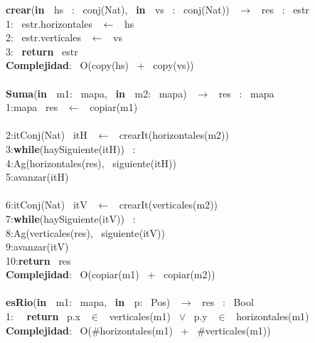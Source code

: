 \begin{Algoritmos}
    
\noindent \noindent\makebox[\linewidth]{\rule{\textwidth}{0.4pt}}
\textbf{crear}(\textbf{in \ }hs \ : \ conj(Nat), \ \textbf{in \ }vs \ : \ conj(Nat)) \ $\longrightarrow$ \ res \ : \ estr\\
1: \ estr.horizontales \ $\leftarrow$ \ hs\\
2: \ estr.verticales \ $\leftarrow$ \ vs \ \\
3: \ \textbf{return} \ estr\\
\textbf{Complejidad}: \ O(copy(hs) \ + \ copy(vs))\\
\noindent\makebox[\linewidth]{\rule{\textwidth}{0.4pt}}
\\
\noindent\makebox[\linewidth]{\rule{\textwidth}{0.4pt}}
\textbf{Suma}(\textbf{in \ }m1: \ mapa, \ \textbf{in \ }m2: \ mapa) \ $\longrightarrow$ \ res \ : \ mapa\\
1:\indent mapa \ res \ $\leftarrow$ \ copiar(m1)\\
\\
2:\indent itConj(Nat) \ itH \ $\leftarrow$ \ crearIt(horizontales(m2))\\
3:\indent \textbf{while}(haySiguiente(itH)) \ :\\
4:\indent \indent Ag(horizontales(res), \ siguiente(itH))\\
5:\indent \indent avanzar(itH)\\
\\
6:\indent itConj(Nat) \ itV \ $\leftarrow$ \ crearIt(verticales(m2))\\
7:\indent \textbf{while}(haySiguiente(itV)) \ :\\
8:\indent \indent Ag(verticales(res), \ siguiente(itV))\\
9:\indent \indent avanzar(itV)\\
10:\indent \textbf{return} \ res\\
\textbf{Complejidad}: \ O(copiar(m1) \ + \ copiar(m2))\\
\noindent\makebox[\linewidth]{\rule{\textwidth}{0.4pt}}
\\
\noindent\makebox[\linewidth]{\rule{\textwidth}{0.4pt}}
\textbf{esRio}(\textbf{in \ }m1: \ mapa, \ \textbf{in \ }p: \ Pos) \ $\longrightarrow$ \ res \ : \ Bool\\
1: \  \ \textbf{return} \ p.x \ $\in$ \ verticales(m1) \ $\vee$ \ p.y \ $\in$ \ horizontales(m1)\\
\textbf{Complejidad}: \ O($ \# $horizontales(m1) \ + \ $ \# $verticales(m1))\\
\noindent\makebox[\linewidth]{\rule{\textwidth}{0.4pt}}

\end{Algoritmos}
